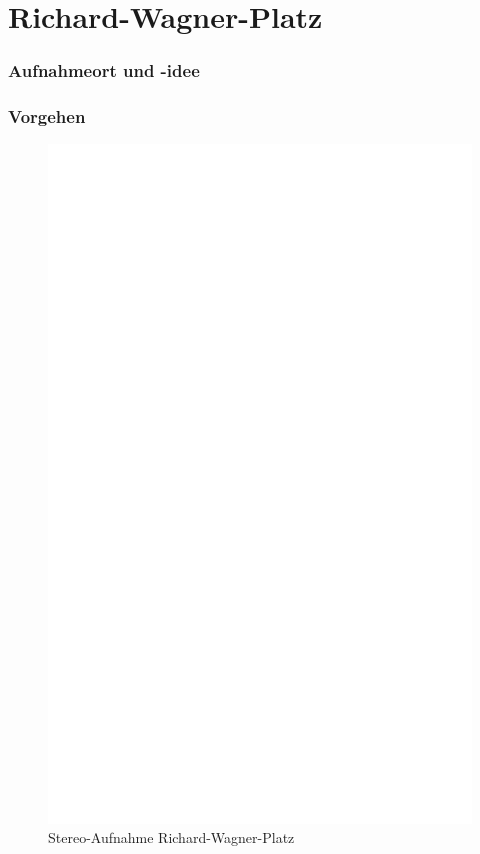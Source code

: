 \documentclass[liststotoc,bibtotoc,fontsize=14pt,]{scrreprt}
\begin{document}
	\section{Richard-Wagner-Platz}
	\label{sec:wagner}
	\subsubsection{Aufnahmeort und -idee}
		
	\subsubsection{Vorgehen}


			 \newpage
			 \begin{figure}[h]
			 	\includegraphics[width=\linewidth]{img/ph.jpg}
			 	\caption{Stereo-Aufnahme Richard-Wagner-Platz}
			 \end{figure}
\end{document}
